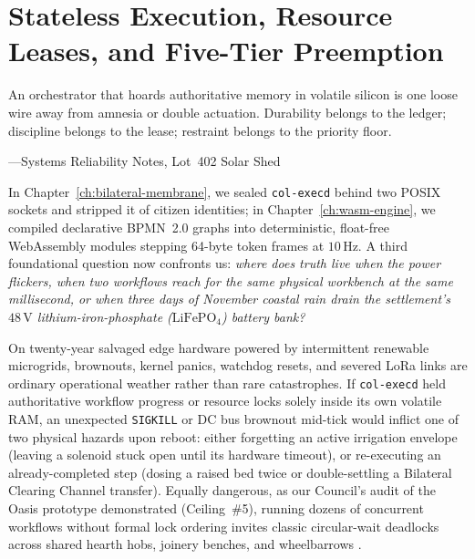 \chapter{Stateless Execution, Resource Leases, and Five-Tier Preemption}
\label{ch:state-leases}

\epigraph{An orchestrator that hoards authoritative memory in volatile silicon is one loose wire away from amnesia or double actuation. Durability belongs to the ledger; discipline belongs to the lease; restraint belongs to the priority floor.}{---Systems Reliability Notes, Lot~402 Solar Shed}

In Chapter~\ref{ch:bilateral-membrane}, we sealed \texttt{col-execd} behind two POSIX
sockets and stripped it of citizen identities; in Chapter~\ref{ch:wasm-engine}, we compiled
declarative BPMN~2.0 graphs into deterministic, float-free WebAssembly modules stepping
64-byte token frames at $10\,\mathrm{Hz}$. A third foundational question now confronts us:
\textit{where does truth live when the power flickers, when two workflows reach for the same
physical workbench at the same millisecond, or when three days of November coastal rain
drain the settlement's $48\,\mathrm{V}$ lithium-iron-phosphate ($\mathrm{LiFePO_4}$) battery
bank?}

On twenty-year salvaged edge hardware powered by intermittent renewable microgrids,
brownouts, kernel panics, watchdog resets, and severed LoRa links are ordinary operational
weather rather than rare catastrophes. If \texttt{col-execd} held authoritative workflow
progress or resource locks solely inside its own volatile RAM, an unexpected
\texttt{SIGKILL} or DC bus brownout mid-tick would inflict one of two physical hazards upon
reboot: either forgetting an active irrigation envelope (leaving a solenoid stuck open until
its hardware timeout), or re-executing an already-completed step (dosing a raised bed twice
or double-settling a Bilateral Clearing Channel transfer). Equally dangerous, as our
Council's audit of the Oasis prototype demonstrated (Ceiling~\#5), running dozens of
concurrent workflows without formal lock ordering invites classic circular-wait deadlocks
across shared hearth hobs, joinery benches, and wheelbarrows
\parencite{coffman1971deadlocks}.

